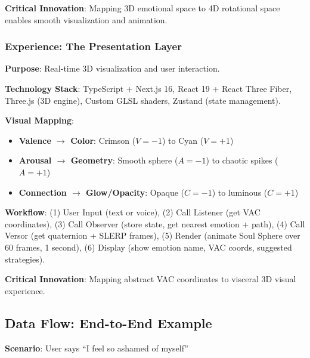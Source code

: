 \documentclass[10pt,twocolumn]{article}
\begin{document}
\textbf{Critical Innovation}: Mapping 3D emotional space to 4D rotational space enables smooth visualization and animation.

\subsubsection{Experience: The Presentation Layer}

\textbf{Purpose}: Real-time 3D visualization and user interaction.

\textbf{Technology Stack}: TypeScript + Next.js 16, React 19 + React Three Fiber, Three.js (3D engine), Custom GLSL shaders, Zustand (state management).

\textbf{Visual Mapping}:
\begin{itemize}
    \item \textbf{Valence $\rightarrow$ Color}: Crimson ($V = -1$) to Cyan ($V = +1$)
    \item \textbf{Arousal $\rightarrow$ Geometry}: Smooth sphere ($A = -1$) to chaotic spikes ($A = +1$)
    \item \textbf{Connection $\rightarrow$ Glow/Opacity}: Opaque ($C = -1$) to luminous ($C = +1$)
\end{itemize}

\textbf{Workflow}: (1) User Input (text or voice), (2) Call Listener (get VAC coordinates), (3) Call Observer (store state, get nearest emotion + path), (4) Call Versor (get quaternion + SLERP frames), (5) Render (animate Soul Sphere over 60 frames, 1 second), (6) Display (show emotion name, VAC coords, suggested strategies).

\textbf{Critical Innovation}: Mapping abstract VAC coordinates to visceral 3D visual experience.

\subsection{Data Flow: End-to-End Example}

\textbf{Scenario}: User says ``I feel so ashamed of myself''
\end{document}
